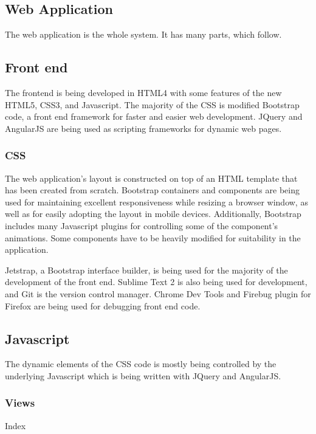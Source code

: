 
\subsection{Web Application}
The web application is the whole system. It has many parts, which follow.

\subsection{Front end}

The frontend is being developed in HTML4 with some features of the new HTML5,
CSS3, and Javascript. The majority of the CSS is modified Bootstrap code, a
front end framework for faster and easier web development. JQuery and AngularJS
are being used as scripting frameworks for dynamic web pages.

\subsubsection{CSS}

The web application's layout is constructed on top of an HTML template that has
been created from scratch. Bootstrap containers and components are being used
for maintaining excellent responsiveness while resizing a browser window, as
well as for easily adopting the layout in mobile devices. Additionally,
Bootstrap includes many Javascript plugins for controlling some of the
component's animations. Some components have to be heavily modified for
suitability in the application.

Jetstrap, a Bootstrap interface builder, is being used for the majority of the
development of the front end. Sublime Text 2 is also being used for
development, and Git is the version control manager. Chrome Dev Tools and
Firebug plugin for Firefox are being used for debugging front end code.

\subsection{Javascript}

The dynamic elements of the CSS code is mostly being controlled by the
underlying Javascript which is being written with JQuery and AngularJS.

\subsubsection{Views}
Index

